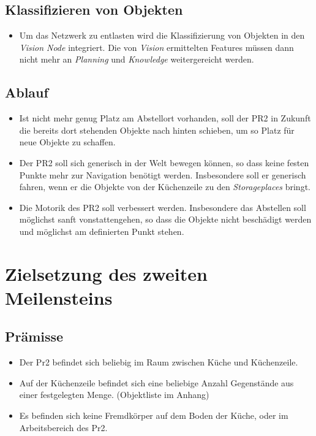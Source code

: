 \documentclass{suturo}
\begin{document}
\subsection*{Klassifizieren von Objekten}
\begin{itemize}
\item Um das Netzwerk zu entlasten wird die Klassifizierung von Objekten in den \textit{Vision Node} integriert. Die von \textit{Vision} ermittelten Features müssen dann nicht mehr an \textit{Planning} und \textit{Knowledge} weitergereicht werden.
\end{itemize}

\subsection*{Ablauf}
\begin{itemize}
\item Ist nicht mehr genug Platz am Abstellort vorhanden, soll der PR2 in Zukunft die bereits dort stehenden Objekte nach hinten schieben, um so Platz für neue Objekte zu schaffen.
\item Der PR2 soll sich generisch in der Welt bewegen können, so dass keine festen Punkte mehr zur Navigation benötigt werden. Insbesondere soll er generisch fahren, wenn er die Objekte von der Küchenzeile zu den \textit{Storageplaces} bringt.
\item Die Motorik des PR2 soll verbessert werden. Insbesondere das Abstellen soll möglichst sanft vonstattengehen, so dass die Objekte nicht beschädigt werden und möglichst am definierten Punkt stehen.
\end{itemize}

\section{Zielsetzung des zweiten Meilensteins}
\subsection{Prämisse}
\begin{itemize}
\item Der Pr2 befindet sich beliebig im Raum zwischen Küche und Küchenzeile.
\item Auf der Küchenzeile befindet sich eine beliebige Anzahl Gegenstände aus einer festgelegten Menge. (Objektliste im Anhang)
\item Es befinden sich keine Fremdkörper auf dem Boden der Küche, oder im Arbeitsbereich des Pr2.
\end{itemize}
\end{document}
